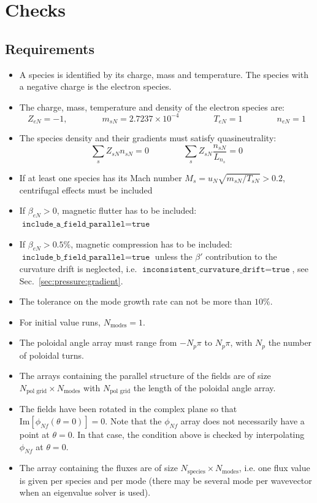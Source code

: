 \documentclass[a4paper]{report}
\begin{document}
\section{Checks}
\subsection{Requirements}
\begin{itemize}
\item A species is identified by its charge, mass and temperature. The species with a negative charge is the electron species.
\item The charge, mass, temperature and density of the electron species are:
\begin{equation}
 Z_{eN}=-1, \qquad \qquad m_{sN} = 2.7237\times 10^{-4} \qquad \qquad T_{eN}=1 \qquad \qquad n_{eN}=1
\end{equation}
\item The species density and their gradients must satisfy quasineutrality:
\begin{equation}
 \sum_s Z_{sN}n_{sN} = 0 \qquad \qquad \sum_s Z_{sN}\frac{n_{sN}}{L_{n_s}}=0
\end{equation}
\item If at least one species has its Mach number $M_s=u_N\sqrt{m_{sN}/T_{sN}}>0.2$, centrifugal effects must be included
\item If $\beta_{eN}>0$, magnetic flutter has to be included: $\texttt{include\_a\_field\_parallel}=\texttt{true}$
\item If $\beta_{eN}>0.5\%$, magnetic compression has to be included: $\texttt{include\_b\_field\_parallel}=\texttt{true}$ unless the $\beta'$ contribution to the curvature drift is neglected, i.e. $\texttt{inconsistent\_curvature\_drift}= \texttt{true}$, see Sec.~\ref{sec:pressure:gradient}.
\item The tolerance on the mode growth rate can not be more than $10\%$.
\item For initial value runs, $N_\textrm{modes}=1$.
\item The poloidal angle array must range from $-N_p \pi$ to $N_p \pi$, with $N_p$ the number of poloidal turns.
\item The arrays containing the parallel structure of the fields are of size $N_\textrm{pol grid}\times N_\textrm{modes}$ with $N_\textrm{pol grid}$ the length of the poloidal angle array.
\item The fields have been rotated in the complex plane so that $\textrm{Im}\left[\phi_{Nf}(\theta=0)\right]=0$. Note that the $\phi_{Nf}$ array does not necessarily have a point at $\theta=0$. In that case, the condition above is checked by interpolating $\phi_{Nf}$ at $\theta=0$.
\item The array containing the fluxes are of size $N_\textrm{species}\times N_\textrm{modes}$, i.e. one flux value is given per species and per mode (there may be several mode per wavevector when an eigenvalue solver is used).
\end{itemize}
\end{document}
